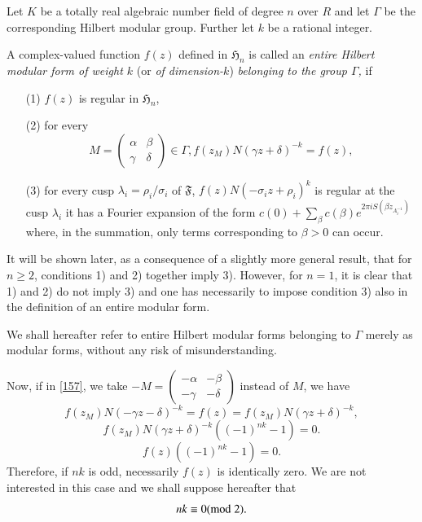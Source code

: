 Let $K$ be a totally real algebraic number field of degree $n$ over
$R$ and let $\Gamma$ be the corresponding Hilbert modular
group. Further let $k$ be a rational integer.

A complex-valued function $f(z)$ defined in $\mathfrak{H}_{n}$ is
called an {\em entire Hilbert modular form of weight $k$} (or {\em of
  dimension-$k$}) {\em belonging to the group $\Gamma$,} if
\begin{itemize}
\item[(1)] $f(z)$ is regular in $\mathfrak{H}_{n}$,

\item[(2)] for every
\begin{equation*}
M=\left(\begin{smallmatrix} 
\alpha &  \beta\\
 \gamma & \delta
\end{smallmatrix}\right)\in\Gamma,
  f(z_{M})N(\gamma z+\delta)^{-k}=f(z), \tag{157}\label{157}
\end{equation*}

\item[(3)] for every cusp $\lambda_{i}=\rho_{i}/\sigma_{i}$ of
  $\mathfrak{F}$, $f(z)N(-\sigma_{i}z+\rho_{i})^{k}$ is regular at the
  cusp $\lambda_{i}$ \ie it has a Fourier expansion of the form
  $c(0)+\sum\limits_{\beta}c(\beta)e^{2\pi iS(\beta z_{A^{-1}_{i}})}$
  where, in the summation, only terms correspo\-nd\-ing to $\beta>0$ can
  occur.
\end{itemize}

It will be shown later, as a consequence of a slightly more general
result, that for $n\geq 2$, conditions 1) and 2) together imply
3). However, for $n=1$, it is clear that 1) and 2) do not imply 3) and
one has necessarily to impose condition 3) also in the definition of
an entire modular form.

We shall hereafter refer to entire Hilbert modular forms belonging to
$\Gamma$ merely as modular forms, without any risk of
misunderstanding.

Now, if in \eqref{157}, we take $-M=\left(\begin{smallmatrix} -\alpha
  & -\beta\\ -\gamma & -\delta\end{smallmatrix}\right)$ instead of
  $M$, we have
$$
f(z_{M})N(-\gamma z-\delta)^{-k}=f(z)=f(z_{M})N(\gamma z+\delta)^{-k},
$$
\ie
$$
f(z_{M})N(\gamma z+\delta)^{-k}((-1)^{nk}-1)=0.
$$
\ie\pageoriginale
$$
f(z)((-1)^{nk}-1)=0.
$$
Therefore, if $nk$ is odd, necessarily $f(z)$ is identically zero. We
are not interested in this case and we shall suppose hereafter that
$$
nk\equiv 0(\rm{mod} \;  2).
$$

